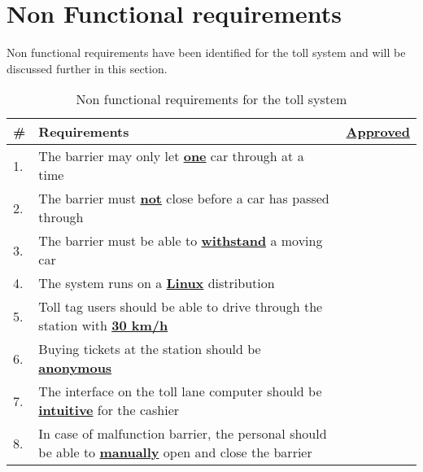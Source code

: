 \section{Non Functional requirements}
Non functional requirements have been identified for the toll system and will be discussed further in this section.

\begin{table}[H]
    \begin{tabular}{| l | p{12cm} | l |}
        \hline
        \#  & \textbf{Requirements} & \textbf{\underline{Approved}} \\\hline
        1.  & The barrier may only let \textbf{\underline{one}} car through at a time & \\\hline
        2.  & The barrier must \textbf{\underline{not}} close before a car has passed through & \\\hline
        3.  & The barrier must be able to \textbf{\underline{withstand}} a moving car & \\\hline
        4.  & The system runs on a \textbf{\underline{Linux}} distribution & \\\hline
        5.  & Toll tag users should be able to drive through the station with \textbf{\underline{30 km/h}} & \\\hline
        6.  & Buying tickets at the station should be \textbf{\underline{anonymous}} & \\\hline
        7.  & The interface on the toll lane computer should be \textbf{\underline{intuitive}} for the cashier & \\\hline
        8.  & In case of malfunction barrier, the personal should be able to \textbf{\underline{manually}} open and close the barrier & \\\hline
    \end{tabular}
    \caption{Non functional requirements for the toll system}
    \label{tab:non-functional}
\end{table}

